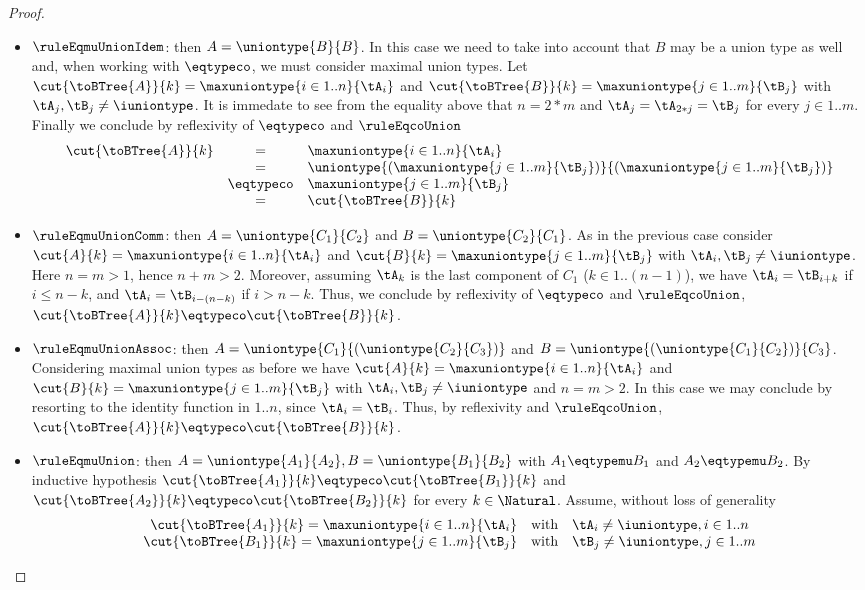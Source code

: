 \begin{proof}
\begin{itemize}
  \item $\ruleEqmuUnionIdem$: then $A = \uniontype{B}{B}$. In this case we need
  to take into account that $B$ may be a union type as well and, when working
  with $\eqtypeco$, we must consider maximal union types. Let
  $\cut{\toBTree{A}}{k} = \maxuniontype{i \in 1..n}{\tA_i}$ and
  $\cut{\toBTree{B}}{k} = \maxuniontype{j \in 1..m}{\tB_j}$ with $\tA_j, \tB_j
  \neq \iuniontype$. It is immedate to see from the equality above that
  $n = 2*m$ and $\tA_j = \tA_{2*j} = \tB_j$ for every $j \in 1..m$. Finally we
  conclude by reflexivity of $\eqtypeco$ and $\ruleEqcoUnion$ $$
\begin{array}{rcl}
\cut{\toBTree{A}}{k} & =         & \maxuniontype{i \in 1..n}{\tA_i} \\
                     & =         & \uniontype{(\maxuniontype{j \in 1..m}{\tB_j})}{(\maxuniontype{j \in 1..m}{\tB_j})} \\
                     & \eqtypeco & \maxuniontype{j \in 1..m}{\tB_j} \\
                     & =         & \cut{\toBTree{B}}{k}
\end{array} $$
  
  \item $\ruleEqmuUnionComm$: then $A = \uniontype{C_1}{C_2}$ and $B =
  \uniontype{C_2}{C_1}$. As in the previous case consider $\cut{A}{k} =
  \maxuniontype{i \in 1..n}{\tA_i}$ and $\cut{B}{k} = \maxuniontype{j \in
  1..m}{\tB_j}$ with $\tA_i, \tB_j \neq \iuniontype$. Here $n = m > 1$, hence
  $n + m > 2$. Moreover, assuming $\tA_k$ is the last component of $C_1$ ($k
  \in 1..(n-1)$), we have $\tA_i = \tB_{i+k}$ if $i \leq n-k$, and $\tA_i =
  \tB_{i-(n-k)}$ if $i > n-k$. Thus, we conclude by reflexivity of $\eqtypeco$
  and $\ruleEqcoUnion$, $\cut{\toBTree{A}}{k} \eqtypeco \cut{\toBTree{B}}{k}$.
  
  \item $\ruleEqmuUnionAssoc$: then $A =
  \uniontype{C_1}{(\uniontype{C_2}{C_3})}$ and $B =
  \uniontype{(\uniontype{C_1}{C_2})}{C_3}$. Considering maximal union types as
  before we have $\cut{A}{k} = \maxuniontype{i \in 1..n}{\tA_i}$ and
  $\cut{B}{k} = \maxuniontype{j \in 1..m}{\tB_j}$ with $\tA_i, \tB_j \neq
  \iuniontype$ and $n = m > 2$. In this case we may conclude by resorting to
  the identity function in $1..n$, since $\tA_i = \tB_i$. Thus, by reflexivity
  and $\ruleEqcoUnion$, $\cut{\toBTree{A}}{k} \eqtypeco \cut{\toBTree{B}}{k}$.
  
  \item $\ruleEqmuUnion$: then $A = \uniontype{A_1}{A_2}, B =
  \uniontype{B_1}{B_2}$ with $A_1 \eqtypemu B_1$ and $A_2 \eqtypemu B_2$. By
  inductive hypothesis $\cut{\toBTree{A_1}}{k} \eqtypeco
  \cut{\toBTree{B_1}}{k}$ and $\cut{\toBTree{A_2}}{k} \eqtypeco
  \cut{\toBTree{B_2}}{k}$ for every $k \in \Natural$. Assume, without loss of
  generality $$
\begin{array}{r@{\quad\text{with}\quad}l}
\cut{\toBTree{A_1}}{k} = \maxuniontype{i \in 1..n}{\tA_i} & \tA_i \neq \iuniontype, i \in 1..n \\
\cut{\toBTree{B_1}}{k} = \maxuniontype{j \in 1..m}{\tB_j} & \tB_j \neq \iuniontype, j \in 1..m
\end{array} $$


\end{itemize}
\end{proof}
